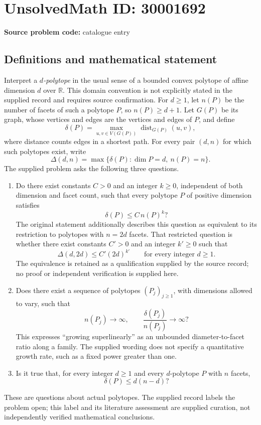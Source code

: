 \documentclass[11pt]{article}
\newcommand{\R}{\mathbb{R}}
\begin{document}
\section*{UnsolvedMath ID: 30001692}
\textbf{Source problem code:} catalogue entry
\subsection{Definitions and mathematical statement}
Interpret a \emph{$d$-polytope} in the usual sense of a bounded convex polytope of affine dimension $d$ over $\R$. This domain convention is not explicitly stated in the supplied record and requires source confirmation. For $d\geq 1$, let $n(P)$ be the number of facets of such a polytope $P$, so $n(P)\geq d+1$. Let $G(P)$ be its graph, whose vertices and edges are the vertices and edges of $P$, and define
\[
\delta(P)=\max_{u,v\in V(G(P))}\operatorname{dist}_{G(P)}(u,v),
\]
where distance counts edges in a shortest path. For every pair $(d,n)$ for which such polytopes exist, write
\[
\Delta(d,n)=\max\{\delta(P):\dim P=d,\ n(P)=n\}.
\]
The supplied problem asks the following three questions.
\begin{enumerate}
\item Do there exist constants $C>0$ and an integer $k\geq 0$, independent of both dimension and facet count, such that every polytope $P$ of positive dimension satisfies
\[
\delta(P)\leq C\,n(P)^k?
\]
The original statement additionally describes this question as equivalent to its restriction to polytopes with $n=2d$ facets. That restricted question is whether there exist constants $C'>0$ and an integer $k'\geq 0$ such that
\[
\Delta(d,2d)\leq C'(2d)^{k'}\qquad\text{for every integer }d\geq 1.
\]
The equivalence is retained as a qualification supplied by the source record; no proof or independent verification is supplied here.
\item Does there exist a sequence of polytopes $(P_j)_{j\geq 1}$, with dimensions allowed to vary, such that
\[
 n(P_j)\longrightarrow\infty,
 \qquad
 \frac{\delta(P_j)}{n(P_j)}\longrightarrow\infty?
\]
This expresses ``growing superlinearly'' as an unbounded diameter-to-facet ratio along a family. The supplied wording does not specify a quantitative growth rate, such as a fixed power greater than one.
\item Is it true that, for every integer $d\geq 1$ and every $d$-polytope $P$ with $n$ facets,
\[
\delta(P)\leq d(n-d)?
\]
\end{enumerate}
These are questions about actual polytopes. The supplied record labels the problem open; this label and its literature assessment are supplied curation, not independently verified mathematical conclusions.
\end{document}
